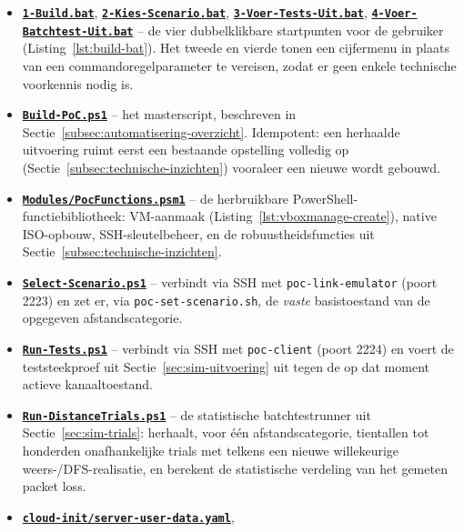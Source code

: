 \begin{itemize}
  \item \textbf{\href{code/scripts/1-Build.bat}{\texttt{1-Build.bat}}},
        \textbf{\href{code/scripts/2-Kies-Scenario.bat}{\texttt{2-Kies-Scenario.bat}}},
        \textbf{\href{code/scripts/3-Voer-Tests-Uit.bat}{\texttt{3-Voer-Tests-Uit.bat}}},
        \textbf{\href{code/scripts/4-Voer-Batchtest-Uit.bat}{\texttt{4-Voer-Batchtest-Uit.bat}}}
        -- de vier dubbelklikbare startpunten voor de gebruiker (Listing~\ref{lst:build-bat}).
        Het tweede en vierde tonen een cijfermenu in plaats van een commandoregelparameter
        te vereisen, zodat er geen enkele technische voorkennis nodig is.
  \item \textbf{\href{code/scripts/Build-PoC.ps1}{\texttt{Build-PoC.ps1}}} -- het
        masterscript, beschreven in Sectie~\ref{subsec:automatisering-overzicht}. Idempotent:
        een herhaalde uitvoering ruimt eerst een bestaande opstelling volledig op
        (Sectie~\ref{subsec:technische-inzichten}) vooraleer een nieuwe wordt gebouwd.
  \item \textbf{\href{code/scripts/Modules/PocFunctions.psm1}{\texttt{Modules/PocFunctions.psm1}}}
        -- de herbruikbare PowerShell-functiebibliotheek: VM-aanmaak
        (Listing~\ref{lst:vboxmanage-create}), native ISO-opbouw, SSH-sleutelbeheer, en de
        robuustheidsfuncties uit Sectie~\ref{subsec:technische-inzichten}.
  \item \textbf{\href{code/scripts/Select-Scenario.ps1}{\texttt{Select-Scenario.ps1}}} --
        verbindt via SSH met \texttt{poc-link-emulator} (poort 2223) en zet er, via
        \texttt{poc-set-scenario.sh}, de \emph{vaste} basistoestand van de opgegeven
        afstandscategorie.
  \item \textbf{\href{code/scripts/Run-Tests.ps1}{\texttt{Run-Tests.ps1}}} -- verbindt via
        SSH met \texttt{poc-client} (poort 2224) en voert de teststeekproef uit
        Sectie~\ref{sec:sim-uitvoering} uit tegen de op dat moment actieve kanaaltoestand.
  \item \textbf{\href{code/scripts/Run-DistanceTrials.ps1}{\texttt{Run-DistanceTrials.ps1}}}
        -- de statistische batchtestrunner uit Sectie~\ref{sec:sim-trials}: herhaalt, voor
        één afstandscategorie, tientallen tot honderden onafhankelijke trials met telkens
        een nieuwe willekeurige weers-/DFS-realisatie, en berekent de statistische
        verdeling van het gemeten packet loss.
  \item \textbf{\href{code/scripts/cloud-init/server-user-data.yaml}{\texttt{cloud-init/server-user-data.yaml}}},

\end{itemize}
